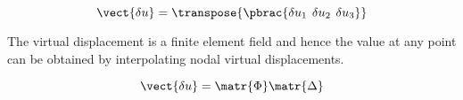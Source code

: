\begin{equation}
  \vect{\delta u}=\transpose{\pbrac{\delta u_{1} \hspace{4 pt} \delta u_{2} \hspace{4 pt} \delta u_{3}}}
  \label{eqn:displacementvector}
\end{equation}

The virtual displacement is a finite element field and hence the value at any point can be obtained by interpolating nodal 
virtual displacements.

\begin{equation}
  \vect{\delta u}=\matr{\Phi}\matr{\Delta}
  \label{eqn:interpolation}
\end{equation}


